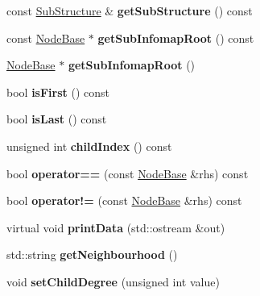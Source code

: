 \begin{DoxyCompactItemize}
const \mbox{\hyperlink{structSubStructure}{Sub\+Structure}} \& {\bfseries get\+Sub\+Structure} () const
\item 
\mbox{\label{classNodeBase_afd2b253dea3d50a1db33c3d0dee94560}} 
const \mbox{\hyperlink{classNodeBase}{Node\+Base}} $\ast$ {\bfseries get\+Sub\+Infomap\+Root} () const
\item 
\mbox{\label{classNodeBase_a1fffe426e6b20f91e6048f46fee1450d}} 
\mbox{\hyperlink{classNodeBase}{Node\+Base}} $\ast$ {\bfseries get\+Sub\+Infomap\+Root} ()
\item 
\mbox{\label{classNodeBase_a91e1147d03b7871024bc42661d505858}} 
bool {\bfseries is\+First} () const
\item 
\mbox{\label{classNodeBase_ad3adfcfac755527f254ad6c7b6a54312}} 
bool {\bfseries is\+Last} () const
\item 
\mbox{\label{classNodeBase_a9ba48e4373d1fbfcd3117c83791897ce}} 
unsigned int {\bfseries child\+Index} () const
\item 
\mbox{\label{classNodeBase_a7b9684a1d3034a59794c3800a5c87a83}} 
bool {\bfseries operator==} (const \mbox{\hyperlink{classNodeBase}{Node\+Base}} \&rhs) const
\item 
\mbox{\label{classNodeBase_a1fb58468d6ab40a1bc20d4ab55590a31}} 
bool {\bfseries operator!=} (const \mbox{\hyperlink{classNodeBase}{Node\+Base}} \&rhs) const
\item 
\mbox{\label{classNodeBase_ace7be3485dd3938c88f053bc60a5d8a7}} 
virtual void {\bfseries print\+Data} (std\+::ostream \&out)
\item 
\mbox{\label{classNodeBase_a064b2515ed7c5afc4f28bb7f97afda6c}} 
std\+::string {\bfseries get\+Neighbourhood} ()
\item 
\mbox{\label{classNodeBase_a1d09eb71c049d8e24e63100bd2f78e7a}} 
void {\bfseries set\+Child\+Degree} (unsigned int value)
\item 
\mbox{\label{classNodeBase_a4b2bb808bc9b7fdd46a1a68df3f62622}} 

\end{DoxyCompactItemize}
